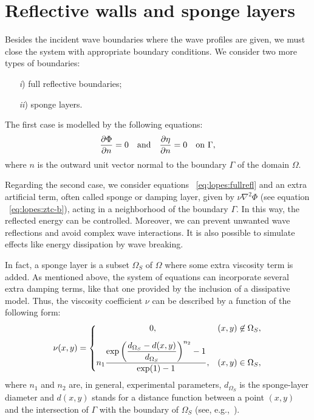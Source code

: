 \section{Reflective walls and sponge layers}\label{sec:lopes:boundaryconditions}

Besides the incident wave boundaries where the wave profiles
are given, we must close the system with appropriate
boundary conditions.  We consider two more types of
boundaries:
\begin{itemize}
\item[{\it i})] full reflective boundaries;
\item[{\it ii})] sponge layers.
\end{itemize}
The first case is modelled by the following equations:
\begin{equation}\label{eq:lopes:fullrefl}
\frac{\partial \Phi}{\partial n}=0\quad {\rm
  and}\quad\frac{\partial \eta}{\partial n}=0\quad {\rm
  on\,\, } \Gamma,
\end{equation}
where $n$ is the outward unit vector normal to the boundary
$\Gamma$ of the domain $\Omega$.

Regarding the second case, we consider equations
~\eqref{eq:lopes:fullrefl} and an extra artificial term,
often called sponge  or damping layer,
given by $\nu\nabla^2\Phi$ (see equation
~\eqref{eq:lopes:ztc-b}), acting in a neighborhood of the
boundary $\Gamma$.  In this way, the reflected energy can be
controlled. Moreover, we can prevent unwanted wave
reflections and avoid complex wave interactions.  It is also
possible to simulate effects like energy dissipation by wave
breaking.

In fact, a sponge layer is a subset $\Omega_S$ of $\Omega$
where some extra viscosity term is added.  As mentioned
above, the system of equations can incorporate several extra
damping terms, like that one provided by the inclusion of a
dissipative model. Thus, the viscosity coefficient $\nu$ can
be described by a function of the following form:
\begin{equation}\label{eq:lopes:sponge}
\nu(x,y)= \left\{
\begin{matrix}
0,& (x,y)\not\in\Omega_S ,\vspace{0.3cm}\\ \displaystyle
n_1\frac{\displaystyle\exp{\left(\frac{d_{\Omega_S}-d(x,y)}
    {d_{\Omega_S}}\right)^{n_2}}-1}{\exp(1)-1},& (x,y)
\in\Omega_S,
\end{matrix}
\right.
\end{equation}
where $n_1$ and $n_2$ are, in general, experimental
parameters, $d_{\Omega_S}$ is the sponge-layer diameter and
$d(x,y)$ stands for a distance function between a point
$(x,y)$ and the intersection of $\Gamma$ with the boundary
of $\Omega_S$ (see, e.g.,~\cite{Walkley1999}).

